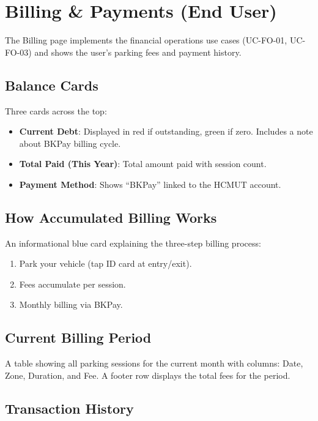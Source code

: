 \documentclass[12pt,a4paper]{article}
\begin{document}
\section{Billing \& Payments (End User)}
\label{sec:billing}

The Billing page implements the financial operations use cases (UC-FO-01, UC-FO-03) and shows the user's parking fees and payment history.

\subsection{Balance Cards}

Three cards across the top:
\begin{itemize}
    \item \textbf{Current Debt}: Displayed in red if outstanding, green if zero. Includes a note about BKPay billing cycle.
    \item \textbf{Total Paid (This Year)}: Total amount paid with session count.
    \item \textbf{Payment Method}: Shows ``BKPay'' linked to the HCMUT account.
\end{itemize}

\subsection{How Accumulated Billing Works}

An informational blue card explaining the three-step billing process:
\begin{enumerate}
    \item Park your vehicle (tap ID card at entry/exit).
    \item Fees accumulate per session.
    \item Monthly billing via BKPay.
\end{enumerate}

\subsection{Current Billing Period}

A table showing all parking sessions for the current month with columns: Date, Zone, Duration, and Fee. A footer row displays the total fees for the period.

\subsection{Transaction History}
\end{document}
